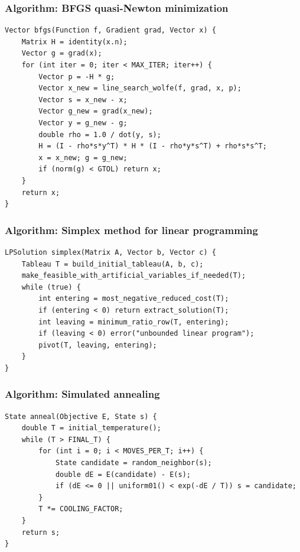 \documentclass[11pt]{article}
\begin{document}
\subsubsection{Algorithm: BFGS quasi-Newton minimization}\label{algorithm-bfgs-quasi-newton-minimization}

\begin{verbatim}
Vector bfgs(Function f, Gradient grad, Vector x) {
    Matrix H = identity(x.n);
    Vector g = grad(x);
    for (int iter = 0; iter < MAX_ITER; iter++) {
        Vector p = -H * g;
        Vector x_new = line_search_wolfe(f, grad, x, p);
        Vector s = x_new - x;
        Vector g_new = grad(x_new);
        Vector y = g_new - g;
        double rho = 1.0 / dot(y, s);
        H = (I - rho*s*y^T) * H * (I - rho*y*s^T) + rho*s*s^T;
        x = x_new; g = g_new;
        if (norm(g) < GTOL) return x;
    }
    return x;
}
\end{verbatim}

\subsubsection{Algorithm: Simplex method for linear programming}\label{algorithm-simplex-method-for-linear-programming}

\begin{verbatim}
LPSolution simplex(Matrix A, Vector b, Vector c) {
    Tableau T = build_initial_tableau(A, b, c);
    make_feasible_with_artificial_variables_if_needed(T);
    while (true) {
        int entering = most_negative_reduced_cost(T);
        if (entering < 0) return extract_solution(T);
        int leaving = minimum_ratio_row(T, entering);
        if (leaving < 0) error("unbounded linear program");
        pivot(T, leaving, entering);
    }
}
\end{verbatim}

\subsubsection{Algorithm: Simulated annealing}\label{algorithm-simulated-annealing}

\begin{verbatim}
State anneal(Objective E, State s) {
    double T = initial_temperature();
    while (T > FINAL_T) {
        for (int i = 0; i < MOVES_PER_T; i++) {
            State candidate = random_neighbor(s);
            double dE = E(candidate) - E(s);
            if (dE <= 0 || uniform01() < exp(-dE / T)) s = candidate;
        }
        T *= COOLING_FACTOR;
    }
    return s;
}
\end{verbatim}
\end{document}
